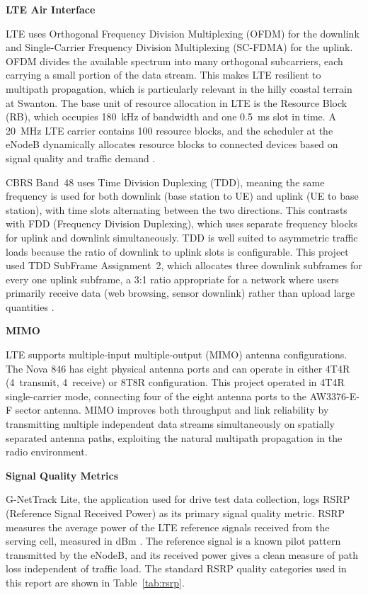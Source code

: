 \documentclass[
    left=1.5in,
    right=1.25in,
    top=1.25in,
    bottom=1.25in
]{CalPolySeniorProject}
\begin{document}
\textbf{LTE Air Interface}

LTE uses Orthogonal Frequency Division Multiplexing (OFDM) for the downlink and
Single-Carrier Frequency Division Multiplexing (SC-FDMA) for the uplink. OFDM
divides the available spectrum into many orthogonal subcarriers, each carrying a
small portion of the data stream. This makes LTE resilient to multipath
propagation, which is particularly relevant in the hilly coastal terrain at
Swanton. The base unit of resource allocation in LTE is the Resource Block (RB),
which occupies 180~kHz of bandwidth and one 0.5~ms slot in time. A 20~MHz LTE
carrier contains 100 resource blocks, and the scheduler at the eNodeB
dynamically allocates resource blocks to connected devices based on signal
quality and traffic demand \autocite{hpe2019cbrsradio}.

CBRS Band~48 uses Time Division Duplexing (TDD), meaning the same frequency is
used for both downlink (base station to UE) and uplink (UE to base station),
with time slots alternating between the two directions. This contrasts with FDD
(Frequency Division Duplexing), which uses separate frequency blocks for uplink
and downlink simultaneously. TDD is well suited to asymmetric traffic loads
because the ratio of downlink to uplink slots is configurable. This project used
TDD SubFrame Assignment~2, which allocates three downlink subframes for every
one uplink subframe, a 3:1 ratio appropriate for a network where users primarily
receive data (web browsing, sensor downlink) rather than upload large quantities
\autocite{houtz2026wlpc}.

\textbf{MIMO}

LTE supports multiple-input multiple-output (MIMO) antenna configurations. The
Nova 846 has eight physical antenna ports and can operate in either 4T4R
(4~transmit, 4~receive) or 8T8R configuration. This project operated in 4T4R
single-carrier mode, connecting four of the eight antenna ports to the
AW3376-E-F sector antenna. MIMO improves both throughput and link reliability by
transmitting multiple independent data streams simultaneously on spatially
separated antenna paths, exploiting the natural multipath propagation in the
radio environment.

\textbf{Signal Quality Metrics}

G-NetTrack Lite, the application used for drive test data collection, logs RSRP
(Reference Signal Received Power) as its primary signal quality metric. RSRP
measures the average power of the LTE reference signals received from the
serving cell, measured in dBm \autocite{hpe2019cbrsradio}. The reference signal
is a known pilot pattern transmitted by the eNodeB, and its received power gives
a clean measure of path loss independent of traffic load. The standard RSRP
quality categories used in this report are shown in Table~\ref{tab:rsrp}.
\end{document}
